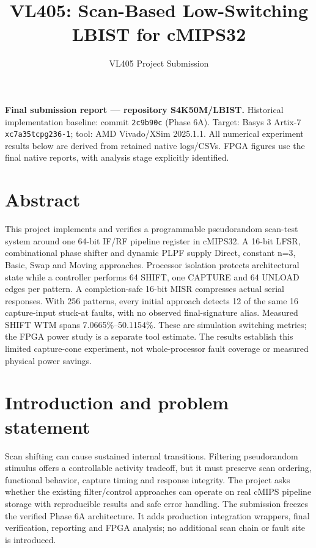 \documentclass[11pt,a4paper]{article}
\begin{document}
\title{VL405: Scan-Based Low-Switching LBIST for cMIPS32}\author{VL405 Project Submission}\date{}\maketitle\tableofcontents\clearpage


\textbf{Final submission report --- repository S4K50M/LBIST.} Historical implementation baseline: commit \texttt{2c9b90c} (Phase 6A). Target: Basys 3 Artix-7 \texttt{xc7a35tcpg236-1}; tool: AMD Vivado/XSim 2025.1.1. All numerical experiment results below are derived from retained native logs/CSVs. FPGA figures use the final native reports, with analysis stage explicitly identified.



\section{Abstract}


This project implements and verifies a programmable pseudorandom scan-test system around one 64-bit IF/RF pipeline register in cMIPS32. A 16-bit LFSR, combinational phase shifter and dynamic PLPF supply Direct, constant n=3, Basic, Swap and Moving approaches. Processor isolation protects architectural state while a controller performs 64 SHIFT, one CAPTURE and 64 UNLOAD edges per pattern. A completion-safe 16-bit MISR compresses actual serial responses. With 256 patterns, every initial approach detects 12 of the same 16 capture-input stuck-at faults, with no observed final-signature alias. Measured SHIFT WTM spans 7.0665\%--50.1154\%. These are simulation switching metrics; the FPGA power study is a separate tool estimate. The results establish this limited capture-cone experiment, not whole-processor fault coverage or measured physical power savings.



\section{Introduction and problem statement}


Scan shifting can cause sustained internal transitions. Filtering pseudorandom stimulus offers a controllable activity tradeoff, but it must preserve scan ordering, functional behavior, capture timing and response integrity. The project asks whether the existing filter/control approaches can operate on real cMIPS pipeline storage with reproducible results and safe error handling. The submission freezes the verified Phase 6A architecture. It adds production integration wrappers, final verification, reporting and FPGA analysis; no additional scan chain or fault site is introduced.
\end{document}
